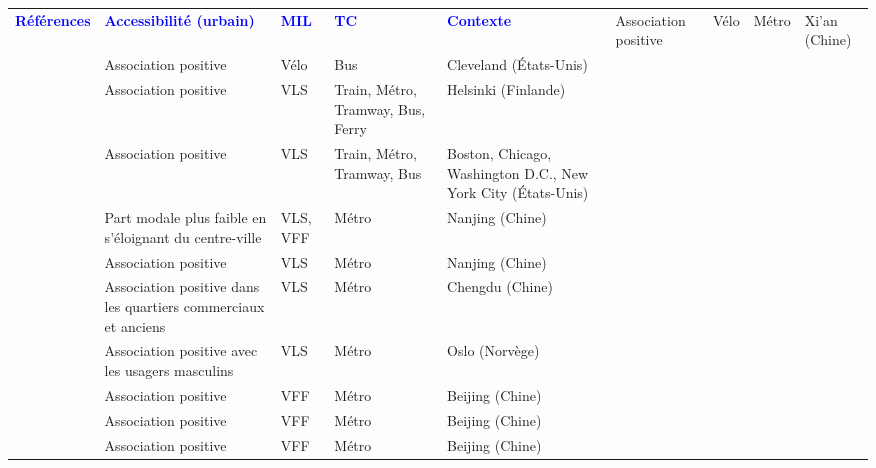         \begin{longtable}{p{3cm}p{4cm}p{1.5cm}p{1.8cm}p{2.3cm}}
        \hline
        \textcolor{blue}{\textbf{Références}} & \textcolor{blue}{\textbf{Accessibilité (urbain)}} & \textcolor{blue}{\textbf{MIL}} & \textcolor{blue}{\textbf{TC}} & \textcolor{blue}{\textbf{Contexte}}
        \hline
        \endhead
    \small{\textcite{zhu_improved_2021}} & \small{Association positive} & \small{Vélo} & \small{Métro} & \small{Xi'an (Chine)}\\
    \small{\textcite{flamm_determinants_2013}} & \small{Association positive} & \small{Vélo} & \small{Bus} & \small{Cleveland (États-Unis)}\\
    \small{\textcite{jappinen_modelling_2013}} & \small{Association positive} & \small{VLS} & \small{Train, Métro, Tramway, Bus, Ferry} & \small{Helsinki (Finlande)}\\
    \small{\textcite{kong_deciphering_2020}} & \small{Association positive} & \small{VLS} & \small{Train, Métro, Tramway, Bus} & \small{Boston, Chicago, Washington D.C., New York City (États-Unis)}\\
    \small{\textcite{chen_what_2022}} & \small{Part modale plus faible en s'éloignant du centre-ville} & \small{VLS, VFF} & \small{Métro} & \small{Nanjing (Chine)}\\
    \small{\textcite{cheng_promoting_2022}} & \small{Association positive} & \small{VLS} & \small{Métro} & \small{Nanjing (Chine)}\\
    \small{\textcite{bi_analysis_2021}} & \small{Association positive dans les quartiers commerciaux et anciens} & \small{VLS} & \small{Métro} & \small{Chengdu (Chine)}\\
    \small{\textcite{bocker_bike_2020}} & \small{Association positive avec les usagers masculins} & \small{VLS} & \small{Métro} & \small{Oslo (Norvège)}\\
    \small{\textcite{jin_competition_2019}} & \small{Association positive} & \small{VFF} & \small{Métro} & \small{Beijing (Chine)}\\
    \small{\textcite{ni_exploring_2020}} & \small{Association positive} & \small{VFF} & \small{Métro} & \small{Beijing (Chine)}\\
    \small{\textcite{yu_understanding_2021}} & \small{Association positive} & \small{VFF} & \small{Métro} & \small{Beijing (Chine)}\\

\end{longtable}

